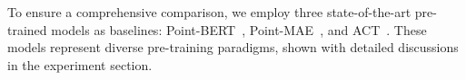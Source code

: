 To ensure a comprehensive comparison, we employ three state-of-the-art pre-trained models as baselines: Point-BERT~\cite{yu2022point}, Point-MAE~\cite{pang2022masked}, and ACT~\cite{dong2022autoencoders}. These models represent diverse pre-training paradigms, shown with detailed discussions in the experiment section.



